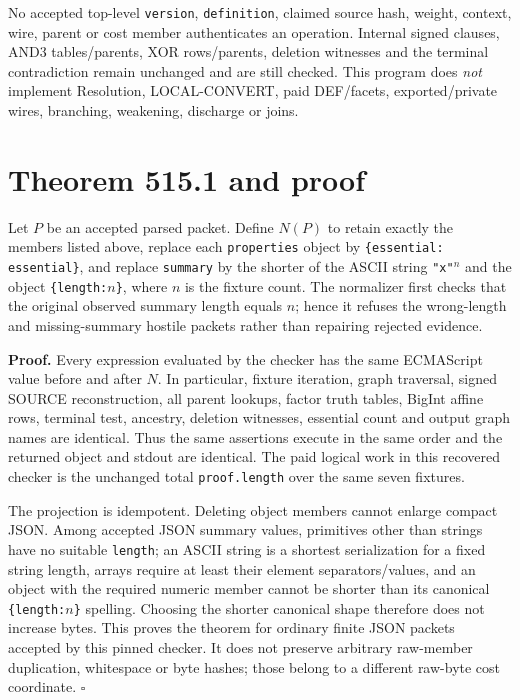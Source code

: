 \documentclass[11pt]{article}
\begin{document}
No accepted top-level \texttt{version}, \texttt{definition}, claimed source hash, weight, context, wire, parent or cost member authenticates an operation.  Internal signed clauses, AND3 tables/parents, XOR rows/parents, deletion witnesses and the terminal contradiction remain unchanged and are still checked.  This program does \emph{not} implement Resolution, LOCAL-CONVERT, paid DEF/facets, exported/private wires, branching, weakening, discharge or joins.

\section*{Theorem 515.1 and proof}
Let $P$ be an accepted parsed packet.  Define $N(P)$ to retain exactly the members listed above, replace each \texttt{properties} object by \texttt{\{essential: essential\}}, and replace \texttt{summary} by the shorter of the ASCII string \texttt{"x"$^n$} and the object \texttt{\{length:$n$\}}, where $n$ is the fixture count.  The normalizer first checks that the original observed summary length equals $n$; hence it refuses the wrong-length and missing-summary hostile packets rather than repairing rejected evidence.

\textbf{Proof.}  Every expression evaluated by the checker has the same ECMAScript value before and after $N$.  In particular, fixture iteration, graph traversal, signed SOURCE reconstruction, all parent lookups, factor truth tables, BigInt affine rows, terminal test, ancestry, deletion witnesses, essential count and output graph names are identical.  Thus the same assertions execute in the same order and the returned object and stdout are identical.  The paid logical work in this recovered checker is the unchanged total \texttt{proof.length} over the same seven fixtures.

The projection is idempotent.  Deleting object members cannot enlarge compact JSON.  Among accepted JSON summary values, primitives other than strings have no suitable \texttt{length}; an ASCII string is a shortest serialization for a fixed string length, arrays require at least their element separators/values, and an object with the required numeric member cannot be shorter than its canonical \texttt{\{length:$n$\}} spelling.  Choosing the shorter canonical shape therefore does not increase bytes.  This proves the theorem for ordinary finite JSON packets accepted by this pinned checker.  It does not preserve arbitrary raw-member duplication, whitespace or byte hashes; those belong to a different raw-byte cost coordinate. \hfill$\square$
\end{document}
